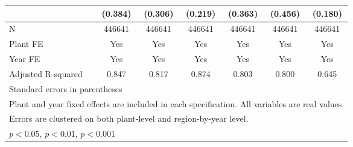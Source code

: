 \begin{table}[htbp]
\begin{tabular}{l*{6}{c}}
                &  (0.384)         &  (0.306)         &  (0.219)         &  (0.363)         &  (0.456)         &  (0.180)         \\
\midrule
N               &   446641         &   446641         &   446641         &   446641         &   446641         &   446641         \\
Plant FE        &      Yes         &      Yes         &      Yes         &      Yes         &      Yes         &      Yes         \\
Year FE         &      Yes         &      Yes         &      Yes         &      Yes         &      Yes         &      Yes         \\
Adjusted R-squared&    0.847         &    0.817         &    0.874         &    0.803         &    0.800         &    0.645         \\
\bottomrule
\multicolumn{7}{l}{\footnotesize Standard errors in parentheses}\\
\multicolumn{7}{l}{\footnotesize Plant and year fixed effects are included in each specification. All variables are real values.}\\
\multicolumn{7}{l}{\footnotesize Errors are clustered on both plant-level and region-by-year level. }\\
\multicolumn{7}{l}{\footnotesize \sym{*} \(p<0.05\), \sym{**} \(p<0.01\), \sym{***} \(p<0.001\)}\\
\end{tabular}
\end{table}
